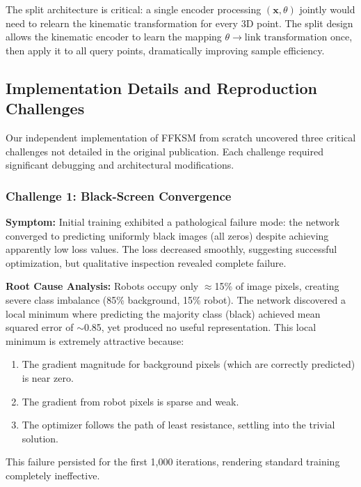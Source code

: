 ﻿\documentclass[12pt,a4paper,oneside]{report}
\begin{document}
The split architecture is critical: a single encoder processing $(\mathbf{x}, \theta)$ jointly would need to relearn the kinematic transformation for every 3D point. The split design allows the kinematic encoder to learn the mapping $\theta \rightarrow \text{link transformation}$ once, then apply it to all query points, dramatically improving sample efficiency.

\subsection{Implementation Details and Reproduction Challenges}

Our independent implementation of FFKSM from scratch uncovered three critical challenges not detailed in the original publication. Each challenge required significant debugging and architectural modifications.

\subsubsection{Challenge 1: Black-Screen Convergence}

\textbf{Symptom:} Initial training exhibited a pathological failure mode: the network converged to predicting uniformly black images (all zeros) despite achieving apparently low loss values. The loss decreased smoothly, suggesting successful optimization, but qualitative inspection revealed complete failure.

\textbf{Root Cause Analysis:} Robots occupy only $\approx$15\% of image pixels, creating severe class imbalance (85\% background, 15\% robot). The network discovered a local minimum where predicting the majority class (black) achieved mean squared error of $\sim$0.85, yet produced no useful representation. This local minimum is extremely attractive because:

\begin{enumerate}
    \item The gradient magnitude for background pixels (which are correctly predicted) is near zero.
    \item The gradient from robot pixels is sparse and weak.
    \item The optimizer follows the path of least resistance, settling into the trivial solution.
\end{enumerate}

This failure persisted for the first 1,000 iterations, rendering standard training completely ineffective.
\end{document}
